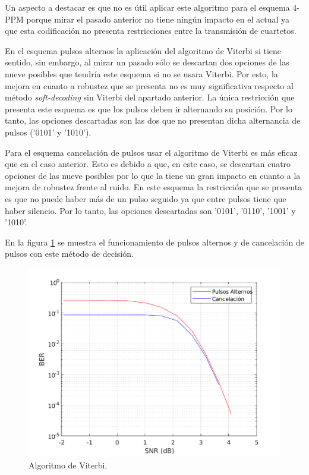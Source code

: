 Un aspecto a destacar es que no es útil aplicar este algoritmo para 
el esquema 4-PPM porque mirar el pasado anterior no tiene ningún impacto en el 
actual ya que esta codificación no presenta restricciones entre la 
transmisión de cuartetos.

En el esquema pulsos alternos la aplicación del algoritmo de Viterbi si tiene sentido,
sin embargo, al mirar un pasado sólo se descartan dos opciones de las nueve posibles 
que tendría este esquema si no se usara Viterbi. Por esto, la mejora en cuanto a 
robustez que se presenta no es muy significativa respecto al método \textit{soft-decoding}
sin Viterbi del apartado anterior. La única restricción que presenta este esquema es que 
los pulsos deben ir alternando su posición. Por lo tanto,
las opciones descartadas son las dos que no presentan dicha 
alternancia de pulsos ('0101' y '1010').

Para el esquema cancelación de pulsos usar el algoritmo de Viterbi es más eficaz que 
en el caso anterior. Esto es debido a que, en este caso, se descartan cuatro opciones de 
las nueve posibles por lo que la tiene un gran impacto en cuanto a la mejora de 
robustez frente al ruido. En este esquema la restricción que se presenta es que no puede 
haber más de un pulso seguido ya que entre pulsos tiene que haber silencio.
Por lo tanto, las opciones descartadas son '0101', '0110', '1001' y '1010'.

En la figura \ref{viterbi} se muestra el funcionamiento de pulsos alternos y de cancelación de pulsos
con este método de decisión.

\begin{figure}[ht]
    \centering
    \includegraphics[scale=0.6]{./figuras/Viterbi.pdf}
    \caption{\small{Algoritmo de Viterbi.}}
    \label{viterbi}%
\end{figure}

